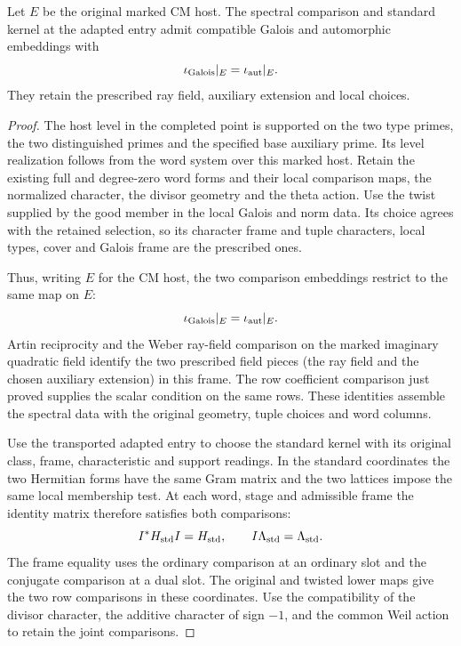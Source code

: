 \begin{proposition}
Let \(E\) be the original marked CM host. The spectral comparison and standard kernel at the adapted entry admit compatible Galois and automorphic embeddings with
\[
 \iota_{\rm Galois}|_E=\iota_{\rm aut}|_E .
\]
They retain the prescribed ray field, auxiliary extension and local choices.
\end{proposition}
\begin{proof}
The host level in the completed point is supported on the two
type primes, the two distinguished primes and the specified
base auxiliary prime. Its level realization follows from the
word system over this marked host. Retain the existing full and
degree-zero word forms and their local comparison maps, the
normalized character, the divisor geometry and the theta action.
Use the twist supplied by the good member in the local Galois
and norm data. Its choice agrees with the retained selection,
so its character frame and tuple characters, local types,
cover and Galois frame are the prescribed ones.

Thus, writing \(E\) for the CM host, the two comparison embeddings restrict to the same map on \(E\):
\[
 \iota_{\rm Galois}|_E=\iota_{\rm aut}|_E .
\] Artin reciprocity and the Weber
ray-field comparison on the marked imaginary quadratic field
identify the two prescribed field pieces (the ray field and
the chosen auxiliary extension) in this frame. The row
coefficient comparison just proved supplies the scalar
condition on the same rows. These identities assemble the
spectral data with the original geometry, tuple choices and
word columns. \label{cor:automorphic-realization-69}

Use the transported adapted entry to choose the standard
kernel with its original class, frame, characteristic and
support readings. In the standard coordinates the two Hermitian forms have the same
Gram matrix and the two lattices impose the same local membership
test. At each word, stage and admissible frame the identity matrix
therefore satisfies both comparisons:
\[
           I^*H_{\rm std}I=H_{\rm std},\qquad
           I\Lambda_{\rm std}=\Lambda_{\rm std}.
\] The
frame equality uses the ordinary comparison at an ordinary
slot and the conjugate comparison at a dual slot. The
original and twisted lower maps give the two row comparisons
in these coordinates. Use the compatibility of the divisor
character, the additive character of sign \(-1\), and the
common Weil action to retain the joint comparisons.


\end{proof}
